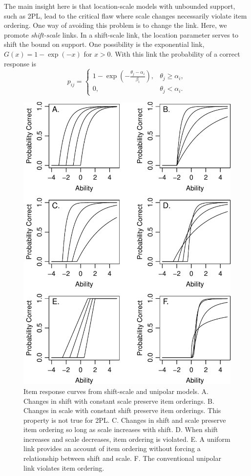 \documentclass[english,,man]{apa6}
\begin{document}
The main insight here is that location-scale models with unbounded support, such as 2PL, lead to the critical flaw where scale changes necessarily violate item ordering. One way of avoiding this problem is to change the link. Here, we promote \emph{shift-scale} links. In a shift-scale link, the location parameter serves to shift the bound on support. One possibility is the exponential link, \(G(x)=1-\exp(-x)\) for \(x>0\). With this link the probability of a correct response is
\[
p_{ij} = \left\{\begin{array}{cc}
1-\exp\left(-\frac{\theta_j-\alpha_i}{\beta_i}\right), & \theta_j \geq \alpha_i,\\
0, & \theta_j < \alpha_i.
\end{array}\right.
\]

\begin{figure}
\centering
\includegraphics{p_files/figure-latex/f2pe-1.pdf}
\caption{\label{fig:f2pe}Item response curves from shift-scale and unipolar models. A. Changes in shift with constant scale preserve item orderings. B. Changes in scale with constant shift preserve item orderings. This property is not true for 2PL. C. Changes in shift and scale preserve item ordering so long as scale increases with shift. D. When shift increases and scale decreases, item ordering is violated. E. A uniform link provides an account of item ordering without forcing a relationship between shift and scale. F. The conventional unipolar link violates item ordering.}
\end{figure}
\end{document}
